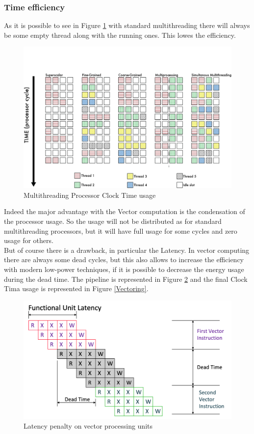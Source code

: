 \subsubsection{Time efficiency}
As it is possible to see in Figure \ref{Multithreading} with standard multithreading there will always be some empty thread along with the running ones. This lowes the efficiency.
\begin{figure}[H]
    \centering
    \includegraphics[scale = 0.43]{Chapter_1/img/threads.png}
    \caption{Multithreading Processor Clock Time usage  \cite{L15-Krste}}
    \label{Multithreading}
\end{figure}

Indeed the major advantage with the Vector computation is the condensation of the processor usage. 
So the usage will not be distributed as for standard multithreading processors, but it will have full usage for some cycles and zero usage for others\cite{L15-Krste}.\\

But of course there is a drawback, in particular the Latency. In vector computing there are always some dead cycles, but this also allows to increase the efficiency with modern low-power techniques, if it is possible to decrease the energy usage during the dead time.
The pipeline is represented in Figure \ref{Vector-Latency} and the final Clock Tima usage is represented in Figure \ref{Vectoring}.

\begin{figure}[H]
    \centering
    \includegraphics[scale = 0.4]{Chapter_1/img/vectoring.png}
    \caption{Latency penalty on vector processing units \cite{L15-Krste}}
    \label{Vector-Latency}
\end{figure}

